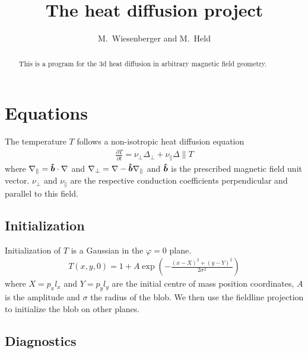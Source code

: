 





\title{The heat diffusion project}
\author{ M.~Wiesenberger and M.~Held}
\maketitle

\begin{abstract}
  This is a program for the 3d heat diffusion in arbitrary magnetic field
  geometry.
  \end{abstract}

\section{Equations}
The temperature $T$ follows a non-isotropic heat diffusion equation
\begin{align}
\frac{\partial T}{\partial t} = \nu_\perp \Delta_\perp + \nu_\parallel\Delta\parallel T
\label{}
\end{align}
where $\nabla_\parallel = \bm{\hat{b}} \cdot\nabla$ and $\nabla_\perp = \nabla - \bm{\hat{b}} \nabla_\parallel$ and
$\bm{\hat{b}}$ is the prescribed magnetic field unit vector.
$\nu_\perp$ and $\nu_\parallel$ are the respective conduction
coefficients perpendicular and parallel to this field.


\subsection{Initialization}
Initialization of $T$ is a Gaussian in the $\varphi =0$ plane.
\begin{align}
    T(x,y,0) = 1 + A\exp\left( -\frac{(x-X)^2 + (y-Y)^2}{2\sigma^2}\right)
    \label{}
\end{align}
where $X = p_x l_x$ and $Y=p_yl_y$ are the initial centre of mass position coordinates, $A$ is the amplitude and $\sigma$ the
radius of the blob.
We then use the fieldline projection to initialize the blob on other planes.
\subsection{Diagnostics}

